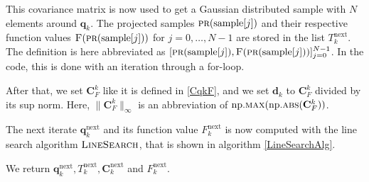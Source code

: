 This covariance matrix is now used to get a Gaussian distributed sample with $N$ elements around $\mathbf{q}_k$. The projected samples $\Call{pr}{\mathrm{sample}[j]}$ and their respective function values $\Call{F}{\protect\Call{pr}{\mathrm{sample}[j]}}$ for $j=0,\dotsc,N-1$ are stored in the list $T^\mathrm{next}_k$. The definition is here abbreviated as $[\Call{pr}{\mathrm{sample}[j]},\Call{F}{\protect\Call{pr}{\mathrm{sample}[j]}}]_{j=0}^{N-1}$. In the code, this is done with an iteration through a for-loop.

After that, we set $\mathbf{C}^k_F$ like it is defined in \eqref{CqkF}, and we set $\mathbf{d}_k$ to $\mathbf{C}^k_F$ divided by its sup norm. Here, $\|\mathbf{C}^k_F\|_\infty$ is an abbreviation of $\mathrm{np.}\Call{max}{\mathrm{np.}\protect\Call{abs}{\mathbf{C}^k_F}}$.

The next iterate $\mathbf{q}^\mathrm{next}_{k}$ and its function value $F^\mathrm{next}_k$ is now computed with the line search algorithm $\textproc{LineSearch}$, that is shown in algorithm \ref{LineSearchAlg}.

We return $\mathbf{q}^\mathrm{next}_k,T^\mathrm{next}_k,\mathbf{C}^\mathrm{next}_k$ and $F^\mathrm{next}_k$.


